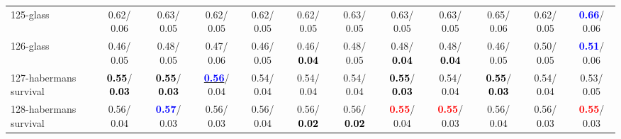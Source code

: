 \begin{table}[h]
\begin{center}
{\begin{tabular}{lc|c|c|c|c|c|c|c|c|c|c}
125-glass &   0.62/  0.06 &   0.63/  0.05 &   0.62/  0.05 &   0.62/  0.05 &   0.62/  0.05 &   0.63/  0.05 &   0.63/  0.05 &   0.63/  0.05 &   0.65/  0.06 &   0.62/  0.05 & \textcolor{blue}{\textbf{  0.66}}/  0.06 \\
126-glass &   0.46/  0.05 &   0.48/  0.05 &   0.47/  0.06 &   0.46/  0.05 &   0.46/\textcolor{black}{\textbf{  0.04}} &   0.48/  0.05 &   0.48/\textcolor{black}{\textbf{  0.04}} &   0.48/\textcolor{black}{\textbf{  0.04}} &   0.46/  0.05 &   0.50/  0.05 & \textcolor{blue}{\textbf{  0.51}}/  0.06 \\
127-habermans survival & \textcolor{black}{\textbf{  0.55}}/\textcolor{black}{\textbf{  0.03}} & \textcolor{black}{\textbf{  0.55}}/\textcolor{black}{\textbf{  0.03}} & \underline{\textcolor{blue}{\textbf{  0.56}}}/  0.04 &   0.54/  0.04 &   0.54/  0.04 &   0.54/  0.04 & \textcolor{black}{\textbf{  0.55}}/\textcolor{black}{\textbf{  0.03}} &   0.54/  0.04 & \textcolor{black}{\textbf{  0.55}}/\textcolor{black}{\textbf{  0.03}} &   0.54/  0.04 &   0.53/  0.05 \\
128-habermans survival &   0.56/  0.04 & \textcolor{blue}{\textbf{  0.57}}/  0.03 &   0.56/  0.03 &   0.56/  0.04 &   0.56/\textcolor{black}{\textbf{  0.02}} &   0.56/\textcolor{black}{\textbf{  0.02}} & \textcolor{red}{\textbf{  0.55}}/  0.04 & \textcolor{red}{\textbf{  0.55}}/  0.03 &   0.56/  0.04 &   0.56/  0.03 & \textcolor{red}{\textbf{  0.55}}/  0.03 \\\end{tabular}}\label{stratsALCKappa3Allalla}
\end{center}
\end{table}
